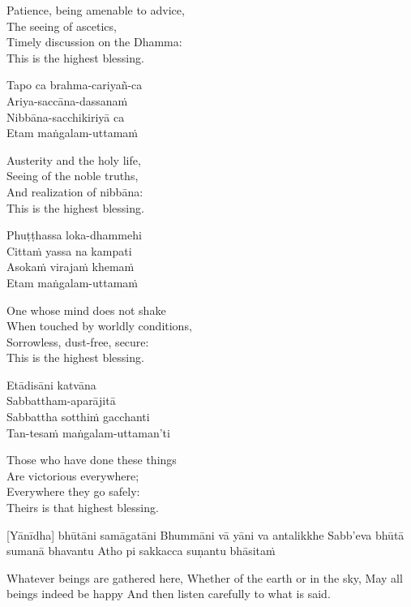 \begin{english}
  Patience, being amenable to advice,\\
  The seeing of ascetics,\\
  Timely discussion on the Dhamma:\\
  This is the highest blessing.
\end{english}

Tapo ca brahma-cariyañ-ca\\
Ariya-saccāna-dassanaṁ\\
Nibbāna-sacchikiriyā ca\\
Etam maṅgalam-uttamaṁ

\begin{english}
  Austerity and the holy life,\\
  Seeing of the noble truths,\\
  And realization of nibbāna:\\
  This is the highest blessing.
\end{english}

Phuṭṭhassa loka-dhammehi\\
Cittaṁ yassa na kampati\\
Asokaṁ virajaṁ khemaṁ\\
Etam maṅgalam-uttamaṁ

\begin{english}
  One whose mind does not shake\\
  When touched by worldly conditions,\\
  Sorrowless, dust-free, secure:\\
  This is the highest blessing.
\end{english}

Etādisāni katvāna\\
Sabbattham-aparājitā\\
Sabbattha sotthiṁ gacchanti\\
Tan-tesaṁ maṅgalam-uttaman’ti

\begin{english}
  Those who have done these things\\
  Are victorious everywhere;\\
  Everywhere they go safely:\\
  Theirs is that highest blessing.
\end{english}
\suttaRef{[Snp 2.4]}

[Yānīdha] bhūtāni samāgatāni
Bhummāni vā yāni va antalikkhe
Sabb’eva bhūtā sumanā bhavantu
Atho pi sakkacca suṇantu bhāsitaṁ

\begin{english}
  Whatever beings are gathered here,
  Whether of the earth or in the sky,
  May all beings indeed be happy
  And then listen carefully to what is said.
\end{english}

